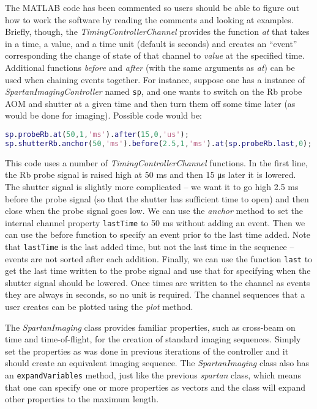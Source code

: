 \documentclass[]{article}
\begin{document}
The MATLAB code has been commented so users should be able to figure out how to work the software by reading the comments and looking at examples.  Briefly, though, the \emph{TimingControllerChannel} provides the function \emph{at} that takes in a time, a value, and a time unit (default is seconds) and creates an ``event'' corresponding the change of state of that channel to \emph{value} at the specified time.  Additional functions \emph{before} and \emph{after} (with the same arguments as \emph{at}) can be used when chaining events together.  For instance, suppose one has a instance of \emph{SpartanImagingController} named \verb|sp|, and one wants to switch on the Rb probe AOM and shutter at a given time and then turn them off some time later (as would be done for imaging).  Possible code would be:
\begin{lstlisting}[language=matlab]
sp.probeRb.at(50,1,'ms').after(15,0,'us');
sp.shutterRb.anchor(50,'ms').before(2.5,1,'ms').at(sp.probeRb.last,0);
\end{lstlisting}
This code uses a number of \emph{TimingControllerChannel} functions.  In the first line, the Rb probe signal is raised high at 50 ms and then 15 \si{\micro\second} later it is lowered.  The shutter signal is slightly more complicated -- we want it to go high 2.5 ms before the probe signal (so that the shutter has sufficient time to open) and then close when the probe signal goes low.  We can use the \emph{anchor} method to set the internal channel property \verb|lastTime| to 50 ms without adding an event.  Then we can use the before function to specify an event prior to the last time added.  Note that \verb|lastTime| is the last added time, but not the last time in the sequence -- events are not sorted after each addition.  Finally, we can use the function \verb|last| to get the last time written to the probe signal and use that for specifying when the shutter signal should be lowered.  Once times are written to the channel as events they are always in seconds, so no unit is required.  The channel sequences that a user creates can be plotted using the \emph{plot} method.

The \emph{SpartanImaging} class provides familiar properties, such as cross-beam on time and time-of-flight, for the creation of standard imaging sequences.  Simply set the properties as was done in previous iterations of the controller and it should create an equivalent imaging sequence.  The \emph{SpartanImaging} class also has an \verb|expandVariables| method, just like the previous \emph{spartan} class, which means that one can specify one or more properties as vectors and the class will expand other properties to the maximum length.  
\end{document}
